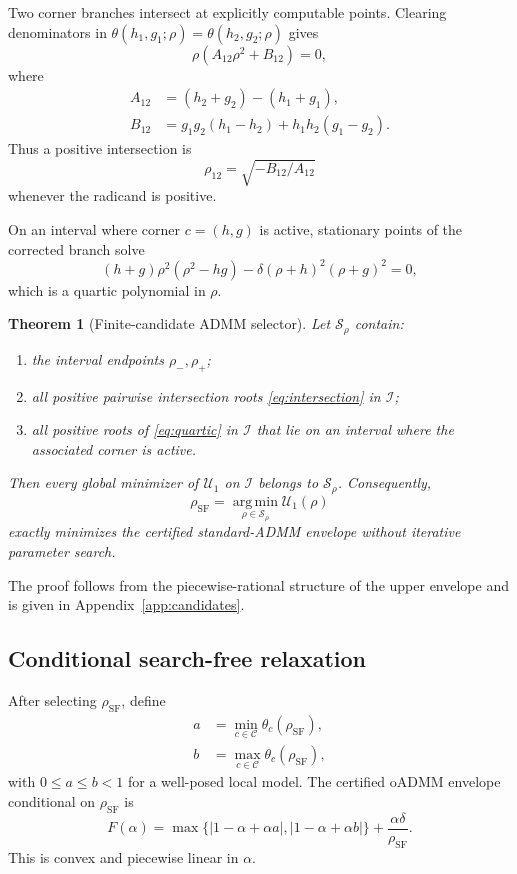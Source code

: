 \documentclass[pdflatex,iicol,sn-mathphys-num]{sn-jnl}
\newtheorem{theorem}{Theorem}[section]
\theoremstyle{definition}\newtheorem{definition}[theorem]{Definition}\newtheorem{remark}[theorem]{Remark}
\newcommand{\argmin}{\operatorname*{arg\,min}}\newcommand{\argmax}{\operatorname*{arg\,max}}\newcommand{\clip}{\operatorname{clip}}\newcommand{\cay}[2]{\mathcal{C}_{#1}(#2)}
\begin{document}
Two corner branches intersect at explicitly computable points. Clearing denominators in
$\theta(h_1,g_1;\rho)=\theta(h_2,g_2;\rho)$ gives
\begin{equation}
\rho\left(A_{12}\rho^2+B_{12}\right)=0,
\label{eq:intersection}
\end{equation}
where
\begin{align}
A_{12}&=(h_2+g_2)-(h_1+g_1),\\
B_{12}&=g_1g_2(h_1-h_2)+h_1h_2(g_1-g_2).
\end{align}
Thus a positive intersection is
\[
\rho_{12}=\sqrt{-B_{12}/A_{12}}
\]
whenever the radicand is positive.

On an interval where corner $c=(h,g)$ is active, stationary points of the corrected branch solve
\begin{equation}
(h+g)\rho^2(\rho^2-hg)
-\delta(\rho+h)^2(\rho+g)^2=0,
\label{eq:quartic}
\end{equation}
which is a quartic polynomial in $\rho$.

\begin{theorem}[Finite-candidate ADMM selector]\label{thm:finite_candidate}
Let $\mathcal S_\rho$ contain:
\begin{enumerate}[leftmargin=2em]
\item the interval endpoints $\rho_-,\rho_+$;
\item all positive pairwise intersection roots \eqref{eq:intersection} in $\mathcal I$;
\item all positive roots of \eqref{eq:quartic} in $\mathcal I$ that lie on an interval where the associated corner is active.
\end{enumerate}
Then every global minimizer of $\mathcal U_1$ on $\mathcal I$ belongs to $\mathcal S_\rho$. Consequently,
\begin{equation}
\rho_{\mathrm{SF}}
=\argmin_{\rho\in\mathcal S_\rho}\mathcal U_1(\rho)
\label{eq:rho_sf}
\end{equation}
exactly minimizes the certified standard-ADMM envelope without iterative parameter search.
\end{theorem}

The proof follows from the piecewise-rational structure of the upper envelope and is given in Appendix~\ref{app:candidates}.

\subsection{Conditional search-free relaxation}
After selecting $\rho_{\mathrm{SF}}$, define
\begin{align}
a&=\min_{c\in\mathcal C}\theta_c(\rho_{\mathrm{SF}}),\\
b&=\max_{c\in\mathcal C}\theta_c(\rho_{\mathrm{SF}}),
\end{align}
with $0\le a\le b<1$ for a well-posed local model. The certified oADMM envelope conditional on $\rho_{\mathrm{SF}}$ is
\begin{equation}
F(\alpha)
=\max\{|1-\alpha+\alpha a|,|1-\alpha+\alpha b|\}
+\frac{\alpha\delta}{\rho_{\mathrm{SF}}}.
\label{eq:alpha_obj}
\end{equation}
This is convex and piecewise linear in $\alpha$.
\end{document}
